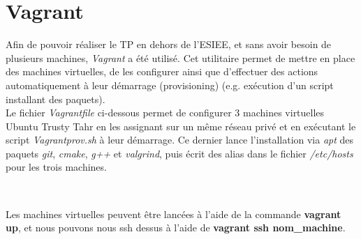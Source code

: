 \section{Vagrant}

Afin de pouvoir réaliser le TP en dehors de l'ESIEE, et sans avoir besoin de plusieurs machines, \emph{Vagrant} \cite{cite:vagrant} a été utilisé. Cet utilitaire permet de mettre en place des machines virtuelles, de les configurer ainsi que d'effectuer des actions automatiquement à leur démarrage (provisioning) (e.g. exécution d'un script installant des paquets).\\

Le fichier \emph{Vagrantfile} ci-dessous permet de configurer 3 machines virtuelles Ubuntu Trusty Tahr en les assignant sur un même réseau privé et en exécutant le script \emph{Vagrantprov.sh} à leur démarrage. Ce dernier lance l'installation via \emph{apt} des paquets \emph{git}, \emph{cmake}, \emph{g++} et \emph{valgrind}, puis écrit des alias dans le fichier \emph{/etc/hosts} pour les trois machines.




\

Les machines virtuelles peuvent être lancées à l'aide de la commande \textbf{vagrant up}, et nous pouvons nous ssh dessus à l'aide de \textbf{vagrant ssh nom\_machine}.
